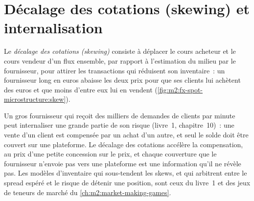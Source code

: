 \section{Décalage des cotations (skewing) et internalisation}

\begin{definition}\label{def:m2:fx-spot-microstructure:skew}
Le \emph{décalage des cotations (skewing)} consiste à déplacer le cours acheteur et le cours vendeur
d'un flux ensemble, par rapport à l'estimation du milieu par le fournisseur, pour attirer les transactions qui réduisent
son inventaire~: un fournisseur long en euros abaisse les deux prix pour que ses clients lui achètent
des euros et que moins d'entre eux lui en vendent (\cref{fig:m2:fx-spot-microstructure:skew}).
\end{definition}

Un gros fournisseur qui reçoit des milliers de demandes de clients par minute peut
internaliser une grande partie de son risque (livre~1, chapitre~10)~: une vente d'un
client est compensée par un achat d'un autre, et seul le solde doit être
couvert sur une plateforme. Le décalage des cotations accélère la compensation, au prix
d'une petite concession sur le prix, et chaque couverture que le fournisseur n'envoie pas
vers une plateforme est une information qu'il ne révèle pas. Les modèles d'inventaire qui sous-tendent
les skews, et qui arbitrent entre le spread espéré et le risque de détenir une position, sont ceux
du livre~1 et des jeux de teneurs de marché du
\cref{ch:m2:market-making-games}.

\begin{omfigure}
\centering
{}

\label{fig:m2:fx-spot-microstructure:skew}
\end{omfigure}

